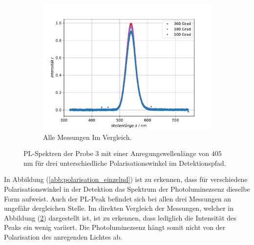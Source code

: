 \begin{figure}[H]
\begin{subfigure}[t]{0.4\textwidth}
	\includegraphics[width=\textwidth]{Plots/aufgabe1b.pdf}
	\caption{Alle Messungen Im Vergleich.}
	\label{abb:polarisation}
	\end{subfigure}
\caption{PL-Spektren der Probe 3 mit einer Anregungswellenl\"{a}nge von $405 \,$nm f\"{u}r drei unterschiedliche Polarisationswinkel im Detektionspfad.}
\end{figure}
In Abbildung (\ref{abb:polarisation_einzelnd}) ist zu erkennen, dass f\"{u}r verschiedene Polarisationswinkel in der Detektion das Spektrum der Photoluminezsenz dieselbe Form aufweist.
Auch der PL-Peak befindet sich bei allen drei Messungen an ungef\"{a}hr dergleichen Stelle.
Im direkten Vergleich der Messungen, welcher in Abbildung (\ref{abb:polarisation}) dargestellt ist, ist zu erkennen, dass lediglich die Intensit\"{a}t des Peaks ein wenig variiert.
Die Photoluminezsenz h\"{a}ngt somit nicht von der Polarisation des anregenden Lichtes ab.

